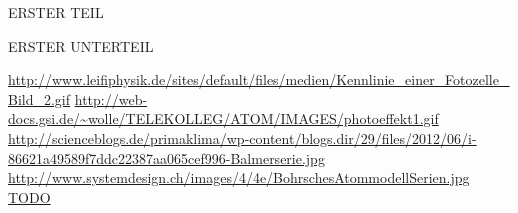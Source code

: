 \documentclass[pdftex, a4paper,11pt, twoside, ngerman]{report}
\begin{document}
  
  \begin{appendix}
    \label{Anhang}
    
    
    
    \begin{chapter}{ERSTER TEIL}
      \label{Anhang:chp:ERSTERTEIL}
      
      
      
      \begin{section}{ERSTER UNTERTEIL}
        \label{Anhang:chp:ERSTERTEIL:sec:UNTERTEIL}
       
       
       
      \end{section}
      
      
    \end{chapter}
    
  \end{appendix}
  
  
  
  \begin{thebibliography}{99}
    \scriptsize
    \url{http://www.leifiphysik.de/sites/default/files/medien/Kennlinie_einer_Fotozelle_Bild_2.gif}
    \url{http://web-docs.gsi.de/~wolle/TELEKOLLEG/ATOM/IMAGES/photoeffekt1.gif}
    \url{http://scienceblogs.de/primaklima/wp-content/blogs.dir/29/files/2012/06/i-86621a49589f7ddc22387aa065cef996-Balmerserie.jpg}
    \url{http://www.systemdesign.ch/images/4/4e/BohrschesAtommodellSerien.jpg}
     \url{TODO}
    
  \end{thebibliography}
  
\end{document}

